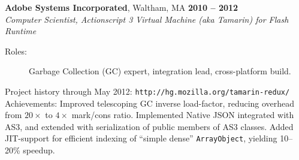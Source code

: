 \documentclass[margin,line,draft]{res}
\def\noneed#1{}
\begin{document}
\begin{resume}
    \textbf{Adobe Systems Incorporated}, Waltham, MA \hfill \textbf{2010 -- 2012}\\\vspace{1mm}%
    \textsl{Computer Scientist, Actionscript 3 Virtual Machine (aka Tamarin) for Flash Runtime}
\begin{description}
\item[\rm Roles:] Garbage Collection (GC) expert,
  integration lead, cross-platform build.
\end{description}
    \vspace{-2mm}
    Project history through May 2012: {\tt http://hg.mozilla.org/tamarin-redux/}\\
    Achievements: Improved telescoping GC inverse load-factor, reducing overhead from $20\times$ to $4\times$ mark/cons ratio. Implemented Native JSON integrated with AS3, and extended with serialization of public members of AS3 classes. Added JIT-support for efficient indexing of ``simple dense'' {\tt ArrayObject}, yielding 10--20\% speedup.
% 
% 
% 
% 

\end{resume}
\end{document}
